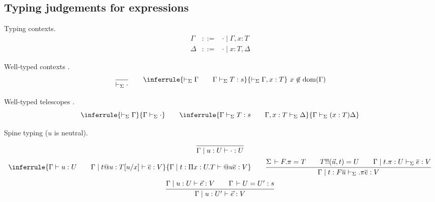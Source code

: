 \documentclass[acmlarge]{acmart}\settopmatter{}
\DeclareMathOperator{\dom}{dom}
\DeclareMathOperator{\proj}{proj}
\renewcommand{\|}{\mid}
\begin{document}
\subsection{Typing judgements for expressions}


Typing contexts.
\[
\begin{array}{lcl}
\Gamma & ::= & \cdot \| \Gamma, x:T \\
\Delta & ::= & \cdot \| x:T, \Delta
\end{array}
\]

Well-typed contexts \fbox{$\vdash_\Sigma \Gamma$}.
\[
\ru{}{\vdash_\Sigma \cdot}
\qquad
\inferrule
  {\vdash_\Sigma \Gamma \qquad \Gamma \vdash_\Sigma T:s}
  {\vdash_\Sigma \Gamma, x : T} \ x \not\in \dom(\Gamma)
\]

Well-typed telescopes \fbox{$\Gamma \vdash_\Sigma \Delta$}.
\[
\inferrule
  {\vdash_\Sigma \Gamma}
  {\Gamma \vdash_\Sigma \cdot}
\qquad
\inferrule{\Gamma \vdash_\Sigma T : s \qquad \Gamma, x:T \vdash_\Sigma \Delta}
{\Gamma \vdash_\Sigma (x:T) \Delta}
\]

Spine typing \fbox{$\Gamma \| u : U \vdash \overline{e} : T$}
($u$ is neutral).
\begin{gather*}
\ru{}
{\Gamma \| u:U \vdash \cdot : U}
\\
\inferrule
  {\Gamma \vdash u:U \qquad \Gamma \| t@u:T[u/x] \vdash \overline{e} : V}
  {\Gamma \| t : \Pi x:U.T \vdash @u \overline{e}:V}
\qquad
\ru{\Sigma \der F.\pi = T \qquad
    T !! (\vec u,t) = U \qquad
    \Gamma \| t.\pi : U \vdash_\Sigma \overline{e} : V
  }{\Gamma \| t :  F\overline{u}  \vdash_\Sigma .\pi \overline{e} : V}
\\
\ru{\Gamma \mid u : U \vdash \vec e : V \qquad
    \Gamma \der U = U' : s
  }{\Gamma \mid u : U' \vdash \vec e : V}
\end{gather*}
\end{document}
